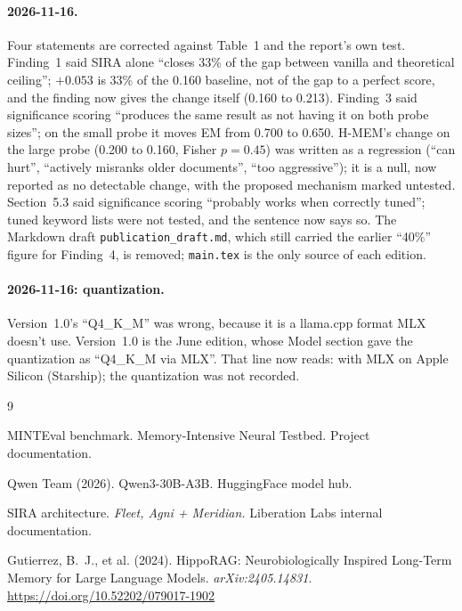 \documentclass[11pt,a4paper]{article}
\begin{document}
\paragraph{2026-11-16.} Four statements are corrected against Table~1 and the report's own test. Finding~1 said SIRA alone ``closes 33\% of the gap between vanilla and theoretical ceiling''; $+0.053$ is 33\% of the 0.160 baseline, not of the gap to a perfect score, and the finding now gives the change itself (0.160 to 0.213). Finding~3 said significance scoring ``produces the same result as not having it on both probe sizes''; on the small probe it moves EM from 0.700 to 0.650. H-MEM's change on the large probe (0.200 to 0.160, Fisher $p=0.45$) was written as a regression (``can hurt'', ``actively misranks older documents'', ``too aggressive''); it is a null, now reported as no detectable change, with the proposed mechanism marked untested. Section~5.3 said significance scoring ``probably works when correctly tuned''; tuned keyword lists were not tested, and the sentence now says so. The Markdown draft \texttt{publication\_draft.md}, which still carried the earlier ``40\%'' figure for Finding~4, is removed; \texttt{main.tex} is the only source of each edition.

\paragraph{2026-11-16: quantization.} Version~1.0's ``Q4\_K\_M'' was wrong, because it is a llama.cpp format MLX doesn't use. Version~1.0 is the June edition, whose Model section gave the quantization as ``Q4\_K\_M via MLX''. That line now reads: with MLX on Apple Silicon (Starship); the quantization was not recorded.

\begin{thebibliography}{9}

MINTEval benchmark.
Memory-Intensive Neural Testbed.
Project documentation.

Qwen Team (2026).
Qwen3-30B-A3B.
HuggingFace model hub.

SIRA architecture.
\textit{Fleet, Agni + Meridian.}
Liberation Labs internal documentation.

Gutierrez, B.~J., et al. (2024).
HippoRAG: Neurobiologically Inspired Long-Term Memory for Large Language Models.
\textit{arXiv:2405.14831}.
\url{https://doi.org/10.52202/079017-1902}

\end{thebibliography}
\end{document}
